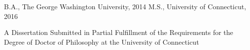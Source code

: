 \documentclass[../dissertation.tex]{subfiles}
\begin{document}
\begin{center}
\huge
\textbf{\ptitle}

\vspace{1cm}
\LARGE
\pauthor
\vspace{1cm}

\large
B.A., The George Washington University, 2014
\linebreak
M.S., University of Connecticut, 2016

\vfill

\normalsize
A Dissertation
\linebreak
Submitted in Partial Fulfillment of the
\linebreak
Requirements for the Degree of
\linebreak
Doctor of Philosophy
\linebreak
at the
\linebreak
University of Connecticut
\end{center}
\end{document}

